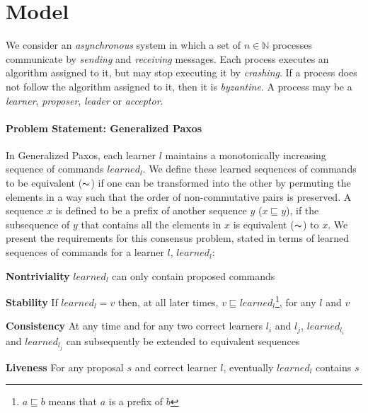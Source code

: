 \section{Model}
\label{sec:model}
%
We consider an \emph{asynchronous} system in which
a set of $n \in \mathbb{N}$ processes communicate by 
\emph{sending} and \emph{receiving} messages.
Each process executes an algorithm assigned to it, but may stop executing it by \emph{crashing}.
If a process does not follow the algorithm assigned to it, then it is \emph{byzantine}.
A process may be a \emph{learner}, \emph{proposer}, \emph{leader} or \emph{acceptor}.

\paragraph{Problem Statement: Generalized Paxos}
In Generalized Paxos, each learner $l$ maintains a monotonically increasing sequence of commands $learned_l$. 
We define these learned sequences of commands to be equivalent ($\thicksim$) 
if one can be transformed into the other by permuting the elements in a way such that the order of non-commutative pairs is preserved. A sequence $x$ is defined to be a prefix of another sequence $y$ ($x \sqsubseteq y$), if the subsequence of $y$ that contains all the elements in $x$ is equivalent ($\thicksim$) to $x$. 
We present the requirements for this consensus problem, stated in terms of learned sequences of commands for a learner $l$, $learned_l$:\par
\textbf{Nontriviality} $learned_l$ can only contain proposed commands \par
\textbf{Stability} If $learned_l = v$ then, at all later times, $v \sqsubseteq learned_l$\footnote{$a \sqsubseteq b$ means that $a$ is a prefix of $b$}, for any $l$ and $v$ \par
\textbf{Consistency} At any time and for any two correct learners $l_i$ and $l_j$, $learned_{l_i}$ and $learned_{l_j}$ can subsequently be extended to equivalent sequences\par
\textbf{Liveness} For any proposal $s$ and correct learner $l$, eventually $learned_l$ contains $s$\par
